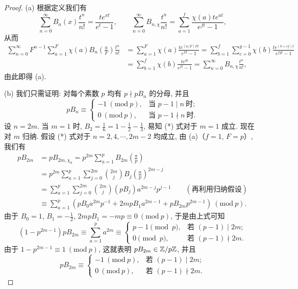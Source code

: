 \begin{proof}
(a) 根据定义我们有
\[
  \sum_{n=0}^{\infty}B_n(x)\frac{t^n}{n!}=\frac{te^{xt}}{e^t-1},\qquad
  \sum_{n=0}^{\infty}B_{n,\chi}\frac{t^n}{n!}=\sum_{a=1}^{f}\frac{\chi(a)te^{at}}{e^{ft}-1},
\]
从而
\begin{align*}
  \sum_{n=0}^{\infty}F^{n-1}\sum_{a=1}^{F}\chi(a)B_n\left(\frac{a}{F}\right)\frac{t^n}{n!}
  &=\sum_{a=1}^{F}\chi(a)\frac{te^{(a/F)Ft}}{e^{Ft}-1}
  =\sum_{b=1}^{f}\sum_{c=0}^{g-1}\chi(b)\frac{te^{(b+cf)t}}{e^{fgt}-1}\\
  &=\sum_{b=1}^{f}\chi(b)\frac{te^{bt}}{e^{ft}-1}
  =\sum_{n=0}^{\infty}B_{n,\chi}\frac{t^n}{n!},
\end{align*}
由此即得 (a).

(b) 我们只需证明: 对每个素数 $p$ 均有 $p\nmid pB_n$ 的分母, 并且
\begin{equation}\tag{*}
  pB_n\equiv\begin{cases}
    -1\ (\mathrm{mod}\ p), & \text{当 } p-1\mid n\ \text{时};\\
    0\ (\mathrm{mod}\ p), & \text{当 } p-1\nmid n\ \text{时}.
  \end{cases}
\end{equation}
设 $n=2m$. 当 $m=1$ 时, $B_2=\frac{1}{6}=1-\frac{1}{2}-\frac{1}{3}$, 易知 (*) 式对于 $m=1$ 成立. 现在对 $m$ 归纳. 假设 (*) 式对于 $n=2,4,\cdots,2m-2$ 均成立, 由 (a)（$f=1$, $F=p$）, 我们有
\begin{align*}
  pB_{2m}&=pB_{2m,\chi_0}=p^{2m}\sum_{a=1}^{p}B_{2m}\left(\frac{a}{p}\right)\\
  &=p^{2m}\sum_{a=1}^{p}\sum_{j=0}^{2m}\binom{2m}{j}B_j\left(\frac{a}{p}\right)^{2m-j}\\
  &=\sum_{a=1}^{p}\sum_{j=0}^{2m}\binom{2m}{j}(pB_j)a^{2m-j}p^{j-1}\qquad(\text{再利用归纳假设})\\
  &\equiv\sum_{a=1}^{p}\left(pB_0a^{2m}p^{-1}+2mpB_1a^{2m-1}+pB_{2m}p^{2m-1}\right)\ (\mathrm{mod}\ p).
\end{align*}
由于 $B_0=1$, $B_1=-\frac{1}{2}$, $2mpB_1=-mp\equiv 0\ (\mathrm{mod}\ p)$, 于是由上式可知
\[
  (1-p^{2m-1})pB_{2m}\equiv\sum_{a=1}^{p}a^{2m}\equiv
  \begin{cases}
    p-1\pmod{p}, & \text{若 } (p-1)\mid 2m;\\
    0\pmod{p}, & \text{若 } (p-1)\nmid 2m.
  \end{cases}
\]
由于 $1-p^{2m-1}\equiv 1\ (\mathrm{mod}\ p)$, 这就表明 $pB_{2m}\in\mathbb{Z}/p\mathbb{Z}$, 并且
\[
  pB_{2m}\equiv\begin{cases}
    -1\ (\mathrm{mod}\ p), & \text{若 } (p-1)\mid 2m;\\
    0\ (\mathrm{mod}\ p), & \text{若 } (p-1)\nmid 2m.
  \end{cases}
\]


\end{proof}

